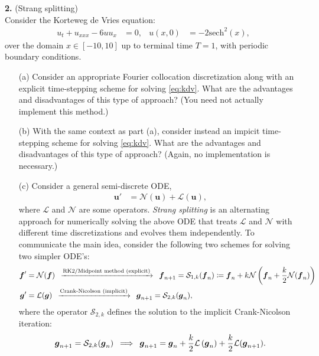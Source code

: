 \documentclass[11pt]{amsart}
\newcommand{\bs}[1]{\boldsymbol{#1}}
\begin{document}
  \textbf{2.} (Strang splitting)\\
  Consider the Korteweg de Vries equation:
  \begin{align}\label{eq:kdv}
    u_t + u_{xxx} - 6 u u_x&= 0, & u(x,0) &= -2 \mathrm{sech}^2(x),
  \end{align}
  over the domain $x \in [-10, 10]$ up to terminal time $T=1$, with periodic boundary conditions.
  \begin{itemize}
     \item[(a)] Consider an appropriate Fourier collocation discretization along with an explicit time-stepping scheme for solving \eqref{eq:kdv}. What are the advantages and disadvantages of this type of approach? (You need not actually implement this method.)
     \item[(b)] With the same context as part (a), consider instead an impicit time-stepping scheme for solving \eqref{eq:kdv}. What are the advantages and disadvantages of this type of approach? (Again, no implementation is necessary.)
    \item[(c)] Consider a general semi-discrete ODE,
      \begin{align}\label{eq:split-ode}
        \bs{u}' &= \mathcal{N}(\bs{u}) + \mathcal{L}(\bs{u}),
      \end{align}
      where $\mathcal{L}$ and $\mathcal{N}$ are some operators. \textit{Strang splitting} is an alternating approach for numerically solving the above ODE that treats $\mathcal{L}$ and $\mathcal{N}$ with different time discretizations and evolves them independently. To communicate the main idea, consider the following two schemes for solving two simpler ODE's:
      \begin{align*}
        \bs{f}' &= \mathcal{N}(\bs{f}) \hskip 5pt \xrightarrow{\textrm{RK2/Midpoint method (explicit)}}  \hskip 5pt\bs{f}_{n+1} = \mathcal{S}_{1,k} (\bs{f}_n) \coloneqq \bs{f}_n + k \mathcal{N}\left(\bs{f}_n + \frac{k}{2} \mathcal{N}(\bs{f}_n)\right) \\
        \bs{g}' &= \mathcal{L}(\bs{g}) \hskip 5pt \xrightarrow{\textrm{Crank-Nicolson (implicit)}} \hskip 5pt \bs{g}_{n+1} = \mathcal{S}_{2,k} (\bs{g}_n),
      \end{align*}
      where the operator $\mathcal{S}_{2,k}$ defines the solution to the implicit Crank-Nicolson iteration:
      \begin{align*}
        \bs{g}_{n+1} = \mathcal{S}_{2,k}(\bs{g}_n) \hskip 5pt \Longrightarrow\hskip 5pt \bs{g}_{n+1} = \bs{g}_n + \frac{k}{2} \mathcal{L}\left(\bs{g}_n\right) + \frac{k}{2} \mathcal{L}(\bs{g}_{n+1}).

\end{align*}
\end{itemize}
\end{document}
